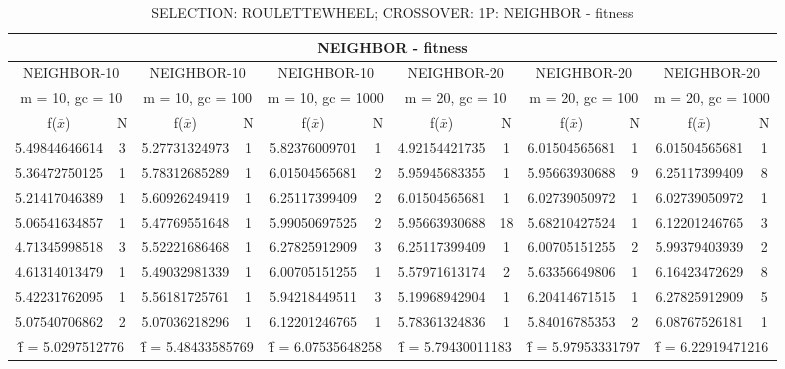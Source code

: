 \begin{table}[H]
	\centering
	\caption{SELECTION: ROULETTEWHEEL; CROSSOVER: 1P: NEIGHBOR - fitness}
	\begin{adjustbox}{width=1\textwidth}
		\begin{tabular}{ |c|c||c|c||c|c||c|c||c|c||c|c| }
			\hline
			\multicolumn{12}{|c|}{NEIGHBOR - fitness} \\
			\hline
			\multicolumn{2}{|c||}{NEIGHBOR-10} & \multicolumn{2}{c||}{NEIGHBOR-10} & \multicolumn{2}{c||}{NEIGHBOR-10} & \multicolumn{2}{c||}{NEIGHBOR-20} & \multicolumn{2}{c||}{NEIGHBOR-20} & \multicolumn{2}{c|}{NEIGHBOR-20}\\
			\hline
			\multicolumn{2}{|c||}{m = 10, gc = 10} & \multicolumn{2}{c||}{m = 10, gc = 100} & \multicolumn{2}{c||}{m = 10, gc = 1000} & \multicolumn{2}{c||}{m = 20, gc = 10} & \multicolumn{2}{c||}{m = 20, gc = 100} & \multicolumn{2}{c|}{m = 20, gc = 1000}\\
			\hline
			f($\bar{x}$) & N & f($\bar{x}$) & N & f($\bar{x}$) & N & f($\bar{x}$) & N & f($\bar{x}$) & N & f($\bar{x}$) & N\\
			\hline
			\hline
			5.49844646614 & 3 & 5.27731324973 & 1 & 5.82376009701 & 1 & 4.92154421735 & 1 & 6.01504565681 & 1 & 6.01504565681 & 1\\
			5.36472750125 & 1 & 5.78312685289 & 1 & 6.01504565681 & 2 & 5.95945683355 & 1 & 5.95663930688 & 9 & 6.25117399409 & 8\\
			5.21417046389 & 1 & 5.60926249419 & 1 & 6.25117399409 & 2 & 6.01504565681 & 1 & 6.02739050972 & 1 & 6.02739050972 & 1\\
			5.06541634857 & 1 & 5.47769551648 & 1 & 5.99050697525 & 2 & 5.95663930688 & 18 & 5.68210427524 & 1 & 6.12201246765 & 3\\
			4.71345998518 & 3 & 5.52221686468 & 1 & 6.27825912909 & 3 & 6.25117399409 & 1 & 6.00705151255 & 2 & 5.99379403939 & 2\\
			4.61314013479 & 1 & 5.49032981339 & 1 & 6.00705151255 & 1 & 5.57971613174 & 2 & 5.63356649806 & 1 & 6.16423472629 & 8\\
			5.42231762095 & 1 & 5.56181725761 & 1 & 5.94218449511 & 3 & 5.19968942904 & 1 & 6.20414671515 & 1 & 6.27825912909 & 5\\
			5.07540706862 & 2 & 5.07036218296 & 1 & 6.12201246765 & 1 & 5.78361324836 & 1 & 5.84016785353 & 2 & 6.08767526181 & 1\\
			\hline
			\multicolumn{2}{|c||}{\^{f} = 5.0297512776} & \multicolumn{2}{c||}{\^{f} = 5.48433585769} & \multicolumn{2}{c||}{\^{f} = 6.07535648258} & \multicolumn{2}{c||}{\^{f} = 5.79430011183} & \multicolumn{2}{c||}{\^{f} = 5.97953331797} & \multicolumn{2}{c|}{\^{f} = 6.22919471216}\\
			\hline
		\end{tabular}
	\end{adjustbox}
\end{table}
